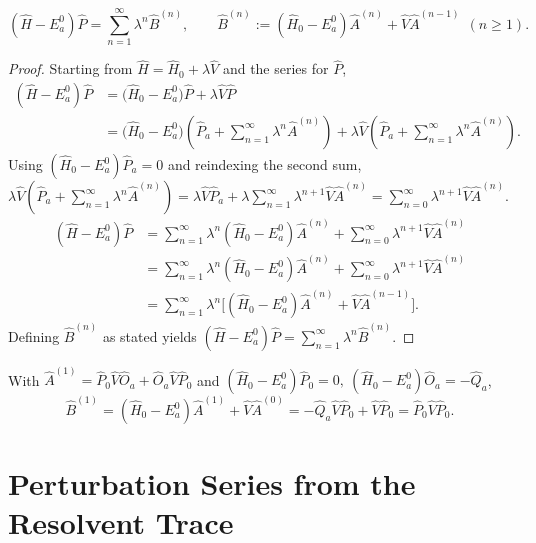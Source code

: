 \begin{proposition}
  \begin{equation}
    (\hat H-E_a^{0})\hat P=\sum_{n=1}^{\infty}\lambda^{n}\hat B^{(n)},
    \qquad
    \hat B^{(n)}:=(\hat H_0-E_a^{0})\hat A^{(n)}+\hat V\hat
    A^{(n-1)}\ \ (n\ge1).
  \end{equation}
\end{proposition}

\begin{proof}
  Starting from $\hat H=\hat H_0+\lambda \hat V$ and the series for $\hat P$,
  \begin{align*}
    (\hat H-E_a^{0})\hat P
    &=\big(\hat H_0-E_a^{0}\big)\hat P+\lambda\hat V\hat P \\
    &=\big(\hat H_0-E_a^{0}\big)\left(\hat
    P_a+\sum_{n=1}^{\infty}\lambda^{n}\hat A^{(n)}\right)
    +\lambda\hat V\left(\hat
    P_a+\sum_{n=1}^{\infty}\lambda^{n}\hat A^{(n)}\right).
  \end{align*}
  Using $(\hat H_0-E_a^{0})\hat P_a=0$ and reindexing the second sum,
  $\lambda \hat V\left(\hat
  P_a+\sum_{n=1}^{\infty}\lambda^{n}\hat A^{(n)}\right) = \lambda
  \hat V \hat P_a + \lambda \sum _{n = 1} ^{\infty} \lambda ^{n+1} \hat
  V \hat A ^{(n)} = \sum_{n=0}^{\infty}\lambda^{n+1}\hat V\hat A^{(n)}$.
  \begin{align*}
    (\hat H-E_a^{0})\hat P
    &=\sum_{n=1}^{\infty}\lambda^{n}(\hat H_0-E_a^{0})\hat A^{(n)}
    +\sum_{n=0}^{\infty}\lambda^{n+1}\hat V\hat A^{(n)} \\
    &=\sum_{n=1}^{\infty}\lambda^{n}(\hat H_0-E_a^{0})\hat A^{(n)}
    +\sum_{n=0}^{\infty}\lambda^{n+1}\hat V\hat A^{(n)} \\
    &=\sum_{n=1}^{\infty}\lambda^{n}\Big[(\hat H_0-E_a^{0})\hat A^{(n)}
    +\hat V\hat A^{(n-1)}\Big].
  \end{align*}
  Defining $\hat B^{(n)}$ as stated yields
  $(\hat H-E_a^{0})\hat P=\sum_{n=1}^{\infty}\lambda^{n}\hat B^{(n)}$.
\end{proof}
With $\hat A^{(1)}=\hat P_0\hat V\hat O_a+\hat O_a\hat V\hat P_0$ and
$(\hat H_0-E_a^{0})\hat P_0=0,\ (\hat H_0-E_a^{0})\hat O_a=-\hat Q_a$,
\[
  \hat B^{(1)}=(\hat H_0-E_a^{0})\hat A^{(1)}+\hat V\hat A^{(0)}
  =-\hat Q_a\hat V\hat P_0+\hat V\hat P_0=\hat P_0\hat V\hat P_0.
\]
\hr
\section{Perturbation Series from the
Resolvent Trace}


